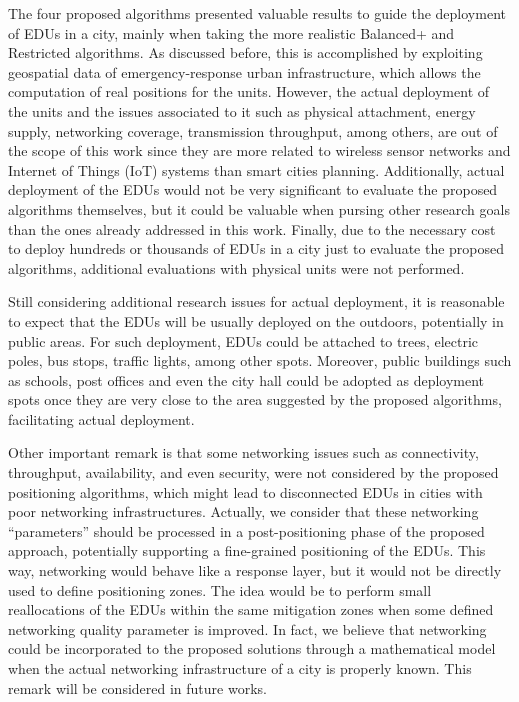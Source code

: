 \begin{refsection}
The four proposed algorithms presented valuable results to guide the deployment of EDUs in a city, mainly when taking the more realistic Balanced+ and Restricted algorithms. As discussed before, this is accomplished by exploiting geospatial data of emergency-response urban infrastructure, which allows the computation of real positions for the units. However, the actual deployment of the units and the issues associated to it such as physical attachment, energy supply, networking coverage, transmission throughput, among others, are out of the scope of this work since they are more related to wireless sensor networks and Internet of Things (IoT) systems than smart cities planning. Additionally, actual deployment of the EDUs would not be very significant to evaluate the proposed algorithms themselves, but it could be valuable when pursing other research goals than the ones already addressed in this work. Finally, due to the necessary cost to deploy hundreds or thousands of EDUs in a city just to evaluate the proposed algorithms, additional evaluations with physical units were not performed.

Still considering additional research issues for actual deployment, it is reasonable to expect that the EDUs will be usually deployed on the outdoors, potentially in public areas. For such deployment, EDUs could be attached to trees, electric poles, bus stops, traffic lights, among other spots. Moreover, public buildings such as schools, post offices and even the city hall could be adopted as deployment spots once they are very close to the area suggested by the proposed algorithms, facilitating actual deployment. 

Other important remark is that some networking issues such as connectivity, throughput, availability, and even security, were not considered by the proposed positioning algorithms, which might lead to disconnected EDUs in cities with poor networking infrastructures. Actually, we consider that these networking ``parameters'' should be processed in a post-positioning phase of the proposed approach, potentially supporting a fine-grained positioning of the EDUs. This way, networking would behave like a response layer, but it would not be directly used to define positioning zones. The idea would be to perform small reallocations of the EDUs within the same mitigation zones when some defined networking quality parameter is improved. In fact, we believe that networking could be incorporated to the proposed solutions through a mathematical model when the actual networking infrastructure of a city is properly known. This remark will be considered in future works.


\end{refsection}

